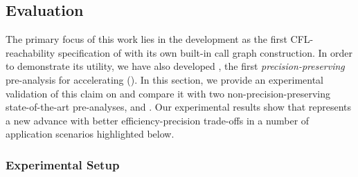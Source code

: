 \subsection{Evaluation}
\label{sec:evaluation}




The primary focus of this work lies in the
development
\LFCR as the first  CFL-reachability specification of  with
its own built-in call graph construction. In order to demonstrate its utility, we
have also developed \tool, the first \emph{precision-preserving} pre-analysis for accelerating  (). In this section, we provide an experimental validation of this claim on \tool and compare it with two non-precision-preserving state-of-the-art pre-analyses, \selectx \cite{lu2021selective} and \zipper \cite{li2018precision}. Our
experimental results show that
\tool represents a new advance with better efficiency-precision trade-offs in a number of application scenarios highlighted below.

\subsubsection{Experimental Setup}
\label{subsec:setup}



